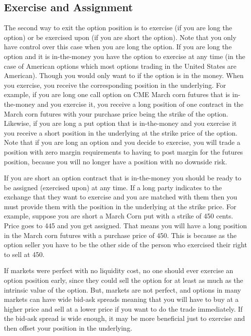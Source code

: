 \documentclass[
  letterpaper,
  DIV=11,
  numbers=noendperiod]{scrreprt}
\begin{document}
\hypertarget{exercise-and-assignment}{%
\subsection{Exercise and Assignment}\label{exercise-and-assignment}}

The second way to exit the option position is to exercise (if you are
long the option) or be exercised upon (if you are short the option).
Note that you only have control over this case when you are long the
option. If you are long the option and it is in-the-money you have the
option to exercise at any time (in the case of American options which
most options trading in the United States are American). Though you
would only want to if the option is in the money. When you exercise, you
receive the corresponding position in the underlying. For example, if
you are long one call option on CME March corn futures that is
in-the-money and you exercise it, you receive a long position of one
contract in the March corn futures with your purchase price being the
strike of the option. Likewise, if you are long a put option that is
in-the-money and you exercise it you receive a short position in the
underlying at the strike price of the option. Note that if you are long
an option and you decide to exercise, you will trade a position with
zero margin requirements to having to post margin for the futures
position, because you will no longer have a position with no downside
risk.

If you are short an option contract that is in-the-money you should be
ready to be assigned (exercised upon) at any time. If a long party
indicates to the exchange that they want to exercise and you are matched
with them then you must provide them with the position in the underlying
at the strike price. For example, suppose you are short a March Corn put
with a strike of 450 cents. Price goes to 445 and you get assigned. That
means you will have a long position in the March corn futures with a
purchase price of 450. This is because as the option seller you have to
be the other side of the person who exercised their right to sell at
450.

If markets were perfect with no liquidity cost, no one should ever
exercise an option position early, since they could sell the option for
at least as much as the intrinsic value of the option. But, markets are
not perfect, and options in many markets can have wide bid-ask spreads
meaning that you will have to buy at a higher price and sell at a lower
price if you want to do the trade immediately. If the bid-ask spread is
wide enough, it may be more beneficial just to exercise and then offset
your position in the underlying.
\end{document}
